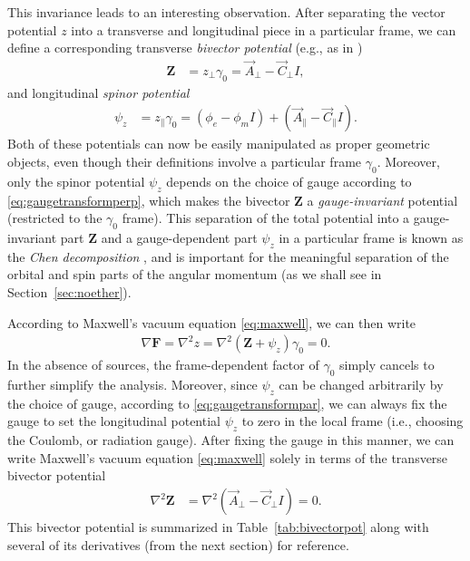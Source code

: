 \documentclass[1p,sort&compress]{elsarticle}
\numberwithin{equation}{section}
\newcommand{\rv}[1]{\vec{#1}}
\newcommand{\bv}[1]{\mathbf{#1}}
\begin{document}
This invariance leads to an interesting observation.  After separating the vector potential $z$ into a transverse and longitudinal piece in a particular frame, we can define a corresponding transverse \emph{bivector potential} (e.g., as in \cite{Bliokh2013})
\begin{align}
  \bv{Z} &= z_\perp \gamma_0 = \rv{A}_\perp - \rv{C}_\perp I,
\end{align}
and longitudinal \emph{spinor potential}
\begin{align}
  \psi_z &= z_\parallel \gamma_0 = (\phi_e - \phi_m I) + (\rv{A}_\parallel - \rv{C}_\parallel I).
\end{align}
Both of these potentials can now be easily manipulated as proper geometric objects, even though their definitions involve a particular frame $\gamma_0$.  Moreover, only the spinor potential $\psi_z$ depends on the choice of gauge according to \eqref{eq:gaugetransformperp}, which makes the bivector $\bv{Z}$ a \emph{gauge-invariant} potential (restricted to the $\gamma_0$ frame).  This separation of the total potential into a gauge-invariant part $\bv{Z}$ and a gauge-dependent part $\psi_z$ in a particular frame is known as the \emph{Chen decomposition} \cite{Chen2008,Leader2014}, and is important for the meaningful separation of the orbital and spin parts of the angular momentum (as we shall see in Section~\ref{sec:noether}).

According to Maxwell's vacuum equation \eqref{eq:maxwell}, we can then write
\begin{align}
  \nabla \bv{F} = \nabla^2 z = \nabla^2(\bv{Z} + \psi_z)\gamma_0 = 0.
\end{align}
In the absence of sources, the frame-dependent factor of $\gamma_0$ simply cancels to further simplify the analysis.  Moreover, since $\psi_z$ can be changed arbitrarily by the choice of gauge, according to \eqref{eq:gaugetransformpar}, we can always fix the gauge to set the longitudinal potential $\psi_z$ to zero in the local frame (i.e., choosing the Coulomb, or radiation gauge).  After fixing the gauge in this manner, we can write Maxwell's vacuum equation \eqref{eq:maxwell} solely in terms of the transverse bivector potential 
\begin{align}\label{eq:bivectormaxwell}
  \nabla^2 \bv{Z} &= \nabla^2(\rv{A}_\perp - \rv{C}_\perp I) = 0.
\end{align}
This bivector potential is summarized in Table~\ref{tab:bivectorpot} along with several of its derivatives (from the next section) for reference.
\end{document}
